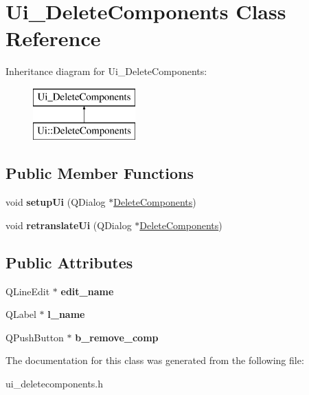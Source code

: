 \hypertarget{classUi__DeleteComponents}{\section{Ui\-\_\-\-Delete\-Components Class Reference}
\label{classUi__DeleteComponents}
}
Inheritance diagram for Ui\-\_\-\-Delete\-Components\-:\begin{figure}[H]
\begin{center}
\leavevmode
\includegraphics[height=2.000000cm]{classUi__DeleteComponents}
\end{center}
\end{figure}
\subsection*{Public Member Functions}
\begin{DoxyCompactItemize}
\item 
\hypertarget{classUi__DeleteComponents_a3d20b977ef8f335cd8b0ec2b2ab89453}{void {\bfseries setup\-Ui} (Q\-Dialog $\ast$\hyperlink{classDeleteComponents}{Delete\-Components})}\label{classUi__DeleteComponents_a3d20b977ef8f335cd8b0ec2b2ab89453}

\item 
\hypertarget{classUi__DeleteComponents_a4b5bfca255829b23527e483457ba47d1}{void {\bfseries retranslate\-Ui} (Q\-Dialog $\ast$\hyperlink{classDeleteComponents}{Delete\-Components})}\label{classUi__DeleteComponents_a4b5bfca255829b23527e483457ba47d1}

\end{DoxyCompactItemize}
\subsection*{Public Attributes}
\begin{DoxyCompactItemize}
\item 
\hypertarget{classUi__DeleteComponents_a741526d789f0a5485fcafc2bb6881d42}{Q\-Line\-Edit $\ast$ {\bfseries edit\-\_\-name}}\label{classUi__DeleteComponents_a741526d789f0a5485fcafc2bb6881d42}

\item 
\hypertarget{classUi__DeleteComponents_a99b79751b6675c91f8ad8f26741dc4cb}{Q\-Label $\ast$ {\bfseries l\-\_\-name}}\label{classUi__DeleteComponents_a99b79751b6675c91f8ad8f26741dc4cb}

\item 
\hypertarget{classUi__DeleteComponents_ac6a29156a3a81464f2539e61e65004ce}{Q\-Push\-Button $\ast$ {\bfseries b\-\_\-remove\-\_\-comp}}\label{classUi__DeleteComponents_ac6a29156a3a81464f2539e61e65004ce}

\end{DoxyCompactItemize}


The documentation for this class was generated from the following file\-:\begin{DoxyCompactItemize}
\item 
ui\-\_\-deletecomponents.\-h\end{DoxyCompactItemize}
